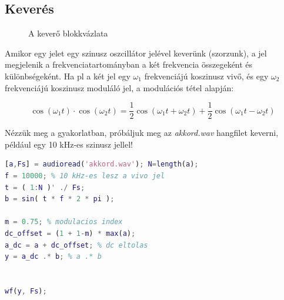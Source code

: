 \documentclass[12pt,a4paper]{article}
\begin{document}
\clearpage

\subsection{Keverés}


\begin{figure}[H]
\label{fig:keverok}
\centering
{}
\caption{
A keverő blokkvázlata} 
\end{figure}

Amikor egy jelet egy szinusz oszcillátor jelével keverünk (szorzunk), a jel megjelenik a frekvenciatartományban a két frekvencia összegeként és különbségeként. Ha pl a két jel egy $\omega_1$ frekvenciájú koszinusz vivő, és egy $\omega_2$ frekvenciájú koszinusz moduláló jel, a modulációs tétel alapján:

\begin{equation}
\cos(\omega_1t) \cdot \cos(\omega_2t) = \frac{1}{2}\cos(\omega_1t+\omega_2t) +  \frac{1}{2}\cos(\omega_1t - \omega_2t)
\end{equation}

Nézzük meg a gyakorlatban, próbáljuk meg az \textit{akkord.wav} hangfilet keverni, például egy 10 kHz-es szinusz jellel!


\begin{lstlisting}[frame=single,language=matlab,caption=Keverés]
[a,Fs] = audioread('akkord.wav'); N=length(a);
f = 10000; % 10 kHz-es lesz a vivo jel
t = ( 1:N )' ./ Fs;
b = sin( t * f * 2 * pi );

m = 0.75; % modulacios index
dc_offset = (1 + 1-m) * max(a);
a_dc = a + dc_offset; % dc eltolas
y = a_dc .* b; % a .* b


wf(y, Fs);
\end{lstlisting}
\end{document}
